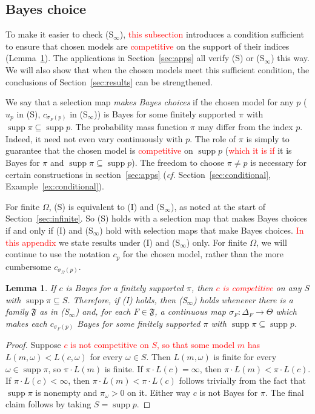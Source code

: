 \documentclass[11pt]{article}
\newtheorem{lemma}[theorem]{Lemma}
\theoremstyle{definition}
\theoremstyle{remark}
\newcommand{\F}{\mathfrak F}
\newcommand{\supp}{\operatorname{supp}}
\begin{document}
\subsection{Bayes choice}\label{sec:bayes}

To make it easier to check (S$_\infty$), \textcolor{red}{this subsection} introduces a condition sufficient to ensure that chosen models are \textcolor{red}{competitive} on the support of their indices (Lemma~\ref{lem:bayes-choice}). The applications in Section~\ref{sec:apps} all verify (S) or (S$_\infty$) this way. We will also show that when the chosen models meet this sufficient condition, the conclusions of Section~\ref{sec:results} can be strengthened.



We say that a selection map \emph{makes Bayes choices} if the chosen model for any $p$ ($u_p$ in (S), $c_{\sigma_F(p)}$ in (S$_\infty$)) is Bayes for some finitely supported $\pi$ with $\supp\pi\subseteq\supp p$. The probability mass function $\pi$ may differ from the index $p$. Indeed, it need not even vary continuously with $p$. The role of $\pi$ is simply to guarantee that the chosen model is \textcolor{red}{competitive} on $\supp p$ (\textcolor{red}{which it is if} it is Bayes for $\pi$ and $\supp\pi\subseteq\supp p$). The freedom to choose $\pi\ne p$ is necessary for certain constructions in section~\ref{sec:apps} (\textit{cf.} Section~\ref{sec:conditional}, Example~\ref{ex:conditional}).

For finite $\Omega$, (S) is equivalent to (I) and (S$_\infty$), as noted at the start of Section~\ref{sec:infinite}. So (S) holds with a selection map that makes Bayes choices if and only if (I) and (S$_\infty$) hold with selection maps that make Bayes choices. \textcolor{red}{In this appendix} we state results under (I) and (S$_\infty$) only. For finite $\Omega$, we will continue to use the notation $c_p$ for the chosen model, rather than the more cumbersome $c_{\sigma_\Omega(p)}$. 


\begin{lemma}\label{lem:bayes-choice}
If $c$ is Bayes for a finitely supported $\pi$, then \textcolor{red}{$c$ is competitive} on any $S$ with $\supp\pi\subseteq S$. Therefore, if (I) holds, then (S$_\infty$) holds whenever there is a family $\F$ as in (S$_\infty$) and, for each $F\in\F$, a continuous map $\sigma_F:\Delta_F\to\Theta$ which makes each $c_{\sigma_F(p)}$ Bayes for some finitely supported $\pi$ with $\supp\pi\subseteq\supp p$.
\end{lemma}
\begin{proof}
Suppose \textcolor{red}{$c$ is not competitive on $S$, so that some model $m$ has} $L(m,\omega)<L(c,\omega)$ for every $\omega\in S$. Then $L(m,\omega)$ is finite for every $\omega\in\supp\pi$, so $\pi\cdot L(m)$ is finite. If $\pi\cdot L(c)=\infty$, then $\pi\cdot L(m)<\pi\cdot L(c)$. If $\pi\cdot L(c)<\infty$, then $\pi\cdot L(m)<\pi\cdot L(c)$ follows trivially from the fact that $\supp\pi$ is nonempty and $\pi_\omega>0$ on it. Either way $c$ is not Bayes for $\pi$. The final claim follows by taking $S=\supp p$.
\end{proof}
\end{document}
